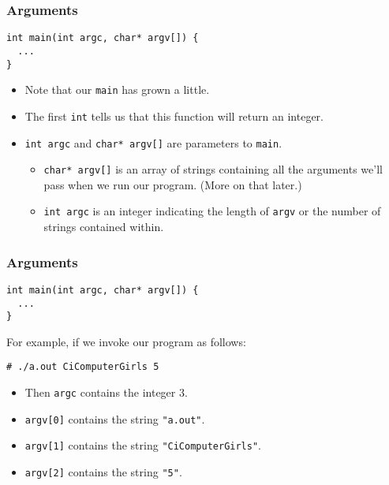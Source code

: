 \documentclass[pdf]{beamer}
\begin{document}
\begin{frame}[fragile]
  \frametitle{Arguments}

\begin{verbatim}
int main(int argc, char* argv[]) {
  ...
}
\end{verbatim}

  \begin{itemize}
  \item Note that our \texttt{main} has grown a little.
    \pause
  \item The first \texttt{int} tells us that this function will return
    an integer.
    \pause
  \item \texttt{int argc} and \texttt{char* argv[]} are
    parameters to \texttt{main}.
    \pause
    \begin{itemize}
    \item \texttt{char* argv[]} is an array of strings containing all the
      arguments we'll pass when we run our program. (More on that later.)
      \pause
    \item \texttt{int argc} is an integer indicating the length of
      \texttt{argv} or the number of strings contained within.
    \end{itemize}
  \end{itemize}
\end{frame}

\begin{frame}[fragile]
  \frametitle{Arguments}
\begin{verbatim}
int main(int argc, char* argv[]) {
  ...
}
\end{verbatim}

  \bigskip

  For example, if we invoke our program as follows:
\begin{verbatim}
# ./a.out CiComputerGirls 5
\end{verbatim}

  \pause

  \bigskip

  \begin{itemize}
  \item Then \texttt{argc} contains the integer 3.
    \pause
  \item \texttt{argv[0]} contains the string \texttt{"a.out"}.
    \pause
  \item \texttt{argv[1]} contains the string \texttt{"CiComputerGirls"}.
    \pause
  \item \texttt{argv[2]} contains the string \texttt{"5"}.
  \end{itemize}

\end{frame}
\end{document}
